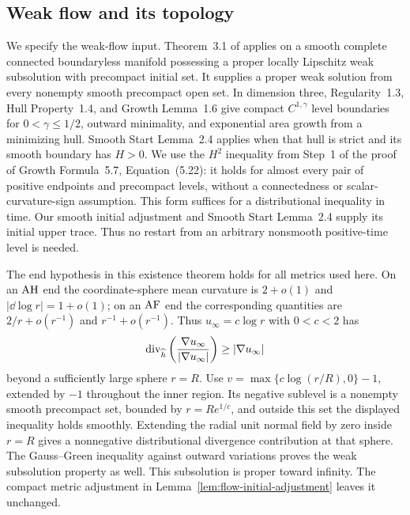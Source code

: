 \subsection{Weak flow and its topology}

We specify the weak-flow input.  Theorem~3.1 of
\citet{HI2001} applies on a smooth complete connected
boundaryless manifold possessing a proper locally Lipschitz weak
subsolution with precompact initial set.  It supplies a proper weak
solution from every nonempty smooth precompact open set.  In dimension
three, Regularity~1.3, Hull Property~1.4, and Growth Lemma~1.6 give
compact $C^{1,\gamma}$ level boundaries for $0<\gamma\le1/2$,
outward minimality, and
exponential area growth from a minimizing hull.  Smooth Start
Lemma~2.4 applies when that hull is strict and its smooth boundary has
$H>0$.  We use the $H^2$ inequality from Step~1 of the proof of
Growth Formula~5.7, Equation~(5.22): it holds for almost every pair of
positive endpoints and precompact levels, without a connectedness or
scalar-curvature-sign assumption.  This form suffices for a
distributional inequality in time.  Our smooth initial adjustment
and Smooth Start Lemma~2.4 supply its initial upper trace.  Thus no
restart from an arbitrary nonsmooth positive-time level is needed.

The end hypothesis in this existence theorem holds for all metrics
used here.  On an $\mathrm{AH}$ end the coordinate-sphere mean curvature is
$2+o(1)$ and $|\dd\log r|=1+o(1)$; on an $\mathrm{AF}$ end the corresponding
quantities are $2/r+o(r^{-1})$ and $r^{-1}+o(r^{-1})$.
Thus $u_\infty=c\log r$ with $0<c<2$ has
\begin{equation}\label{eq:flow-end-subsolution}
 \operatorname{div}_{\widehat h}\left(
    \frac{\nabla u_\infty}{|\nabla u_\infty|}\right)
 \ge |\nabla u_\infty|
\end{equation}
beyond a sufficiently large sphere $r=R$.  Use
$v=\max\{c\log(r/R),0\}-1$, extended by $-1$ throughout the inner
region.  Its negative sublevel is a nonempty smooth precompact set,
bounded by $r=R e^{1/c}$, and outside this set the displayed inequality
holds smoothly.  Extending the radial unit normal field by zero
inside $r=R$ gives a nonnegative distributional divergence
contribution at that sphere.  The Gauss--Green inequality against
outward variations proves the weak subsolution property as well.
This subsolution is proper toward infinity.  The compact
metric adjustment in Lemma~\ref{lem:flow-initial-adjustment} leaves it
unchanged.

